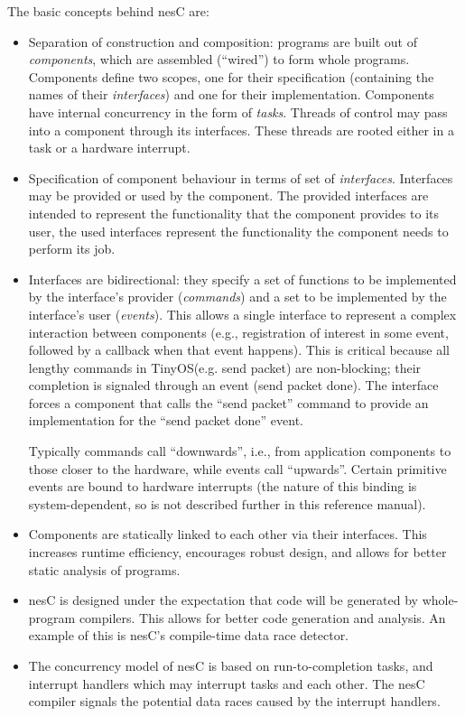 \documentclass[11pt,letterpaper]{article}
\newcommand{\nesc}{nesC\xspace}
\newcommand{\tinyos}{TinyOS\xspace}
\begin{document}
The basic concepts behind \nesc are:
\begin{itemize}
\item Separation of construction and composition: programs are built out of
\emph{components}, which are assembled (``wired'') to form whole
programs. Components define two scopes, one for their specification
(containing the names of their \emph{interfaces}) and one for
their implementation. Components have internal concurrency in the form of
\emph{tasks}. Threads of control may pass into a component through its
interfaces. These threads are rooted either in a task or a hardware
interrupt.

\item Specification of component behaviour in terms of set of
\emph{interfaces}. Interfaces may be provided or used by the component. The
provided interfaces are intended to represent the functionality that the
component provides to its user, the used interfaces represent the
functionality the component needs to perform its job.

\item Interfaces are bidirectional: they specify a set of functions to be
implemented by the interface's provider (\emph{commands}) and a set to be
implemented by the interface's user (\emph{events}). This allows a single
interface to represent a complex interaction between components (e.g.,
registration of interest in some event, followed by a callback when
that event happens). This is critical because all lengthy commands in
\tinyos (e.g. send packet) are non-blocking; their completion is
signaled through an event (send packet done). The interface forces a
component that calls the ``send packet'' command to provide an
implementation for the ``send packet done'' event.

Typically commands call ``downwards'', i.e., from application components to
those closer to the hardware, while events call ``upwards''. Certain primitive
events are bound to hardware interrupts (the nature of this binding is
system-dependent, so is not described further in this reference manual).

\item Components are statically linked to each other via their interfaces.
This increases runtime efficiency, encourages robust design, and allows for
better static analysis of programs.

\item \nesc is designed under the expectation that code will be generated
by whole-program compilers. This allows for better code generation and
analysis. An example of this is nesC's compile-time data race detector.

\item The concurrency model of \nesc is based on run-to-completion tasks,
and interrupt handlers which may interrupt tasks and each other. The \nesc
compiler signals the potential data races caused by the interrupt handlers.
\end{itemize}
\end{document}

